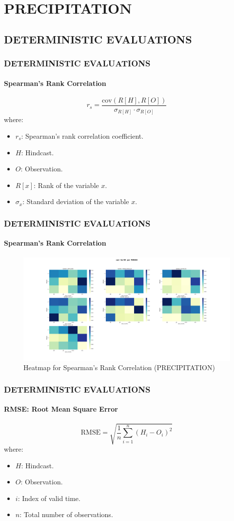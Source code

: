 
\section{PRECIPITATION}
\subsection{DETERMINISTIC EVALUATIONS}

\begin{frame}
\frametitle{DETERMINISTIC EVALUATIONS}
\framesubtitle{Spearman's Rank Correlation}
$$r_s = \frac{\text{cov}(R[H], R[O])}{\sigma_{R[H]} \cdot \sigma_{R[O]}}$$
where:
\begin{itemize}
    \item \( r_s \): Spearman's rank correlation coefficient.
    \item \( H \): Hindcast.
    \item \( O \): Observation.
    \item \( R[x] \): Rank of the variable \( x \).
    \item \( \sigma_x \): Standard deviation of the variable \( x \).
\end{itemize}
\end{frame}

\begin{frame}
\frametitle{DETERMINISTIC EVALUATIONS}
\framesubtitle{Spearman's Rank Correlation}
\begin{figure}[H]
    \centering
    \includegraphics[width=1\linewidth]{corr_RR_ PERIOD.png}
    \caption{Heatmap for Spearman's Rank Correlation (PRECIPITATION)}
    \label{fig:spearman-correlation}
\end{figure}
\end{frame}

\begin{frame}
\frametitle{DETERMINISTIC EVALUATIONS}
\framesubtitle{RMSE: Root Mean Square Error}

$$\text{RMSE} = \sqrt{\frac{1}{n} \sum\limits_{i=1}^{n}(H_i - O_i)^2}$$
where:
\begin{itemize}
    \item \( H \): Hindcast.
    \item \( O \): Observation.
    \item \( i \): Index of valid time.
    \item \( n \): Total number of observations.
\end{itemize}
\end{frame}

